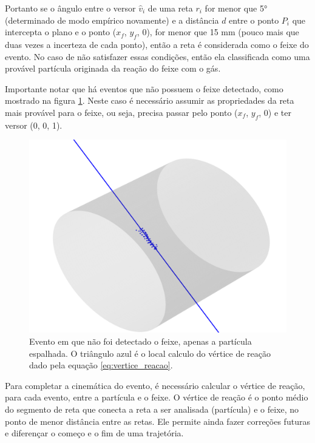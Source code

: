 \documentclass[a4paper,12pt,oneside]{book}
\begin{document}
\par Portanto se o ângulo entre o versor $\hat{v}_i$ de uma reta $r_i$ for menor que 5° (determinado de modo empírico novamente) e a distância $d$ entre o ponto $P_i$ que intercepta o plano e o ponto ($x_f$, $y_f$, 0), for menor que 15 mm (pouco mais que duas vezes a incerteza de cada ponto), então a reta é considerada como o feixe do evento. No caso de não satisfazer essas condições, então ela classificada como uma provável partícula originada da reação do feixe com o gás.

\par Importante notar que há eventos que não possuem o feixe detectado, como mostrado na figura \ref{fig:exemplo_sem_feixe}. Neste caso é necessário assumir as propriedades da reta mais provável para o feixe, ou seja, precisa passar pelo ponto ($x_f$, $y_f$, 0) e ter versor (0, 0, 1).

\begin{figure}[H]
    \centering
    \includegraphics[scale = 0.65]{figs/Figure_12.png}
    \caption{Evento em que não foi detectado o feixe, apenas a partícula espalhada. O triângulo azul é o local calculo do vértice de reação dado pela equação \ref{eq:vertice_reacao}.}
    \label{fig:exemplo_sem_feixe}
\end{figure}

\par Para completar a cinemática do evento, é necessário calcular o vértice de reação, para cada evento, entre a partícula e o feixe. O vértice de reação é o ponto médio do segmento de reta que conecta a reta a ser analisada (partícula) e o feixe, no ponto de menor distância entre as retas. Ele permite ainda fazer correções futuras e diferençar o começo e o fim de uma trajetória.
\end{document}
